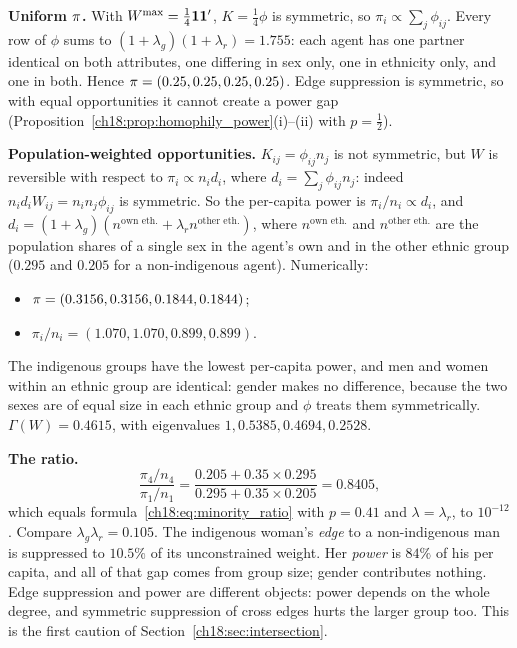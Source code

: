 \documentclass[../solutions_manual.tex]{subfiles}
\begin{document}
 \textbf{Uniform $\pi$.} With $W^{\max} = \frac14\mathbf{1}\mathbf{1}'$, $K = \frac14\phi$ is symmetric, so $\pi_i \propto \sum_j\phi_{ij}$. Every row of $\phi$ sums to $(1+\lambda_g)(1+\lambda_r) = 1.755$: each agent has one partner identical on both attributes, one differing in sex only, one in ethnicity only, and one in both. Hence $\pi = (0.25,\allowbreak 0.25,\allowbreak 0.25,\allowbreak 0.25)$. Edge suppression is symmetric, so with equal opportunities it cannot create a power gap (Proposition~\ref{ch18:prop:homophily_power}(i)--(ii) with $p = \frac12$).

 \textbf{Population-weighted opportunities.} $K_{ij} = \phi_{ij}n_j$ is not symmetric, but $W$ is reversible with respect to $\pi_i \propto n_i d_i$, where $d_i = \sum_j\phi_{ij}n_j$: indeed $n_id_iW_{ij} = n_in_j\phi_{ij}$ is symmetric. So the per-capita power is $\pi_i/n_i \propto d_i$, and $d_i = (1+\lambda_g)(n^{\text{own eth.}} + \lambda_r n^{\text{other eth.}})$, where $n^{\text{own eth.}}$ and $n^{\text{other eth.}}$ are the population shares of a single sex in the agent's own and in the other ethnic group ($0.295$ and $0.205$ for a non-indigenous agent). Numerically:
\begin{itemize}
\item $\pi = (0.3156,\allowbreak 0.3156,\allowbreak 0.1844,\allowbreak 0.1844)$;
\item $\pi_i/n_i = (1.070,\allowbreak 1.070,\allowbreak 0.899,\allowbreak 0.899)$.
\end{itemize}
The indigenous groups have the lowest per-capita power, and men and women within an ethnic group are identical: gender makes no difference, because the two sexes are of equal size in each ethnic group and $\phi$ treats them symmetrically. $\Gamma(W) = 0.4615$, with eigenvalues $1, 0.5385, 0.4694, 0.2528$.

 \textbf{The ratio.}
\[
\frac{\pi_4/n_4}{\pi_1/n_1} = \frac{0.205 + 0.35 \times 0.295}{0.295 + 0.35 \times 0.205} = 0.8405,
\]
which equals formula~\eqref{ch18:eq:minority_ratio} with $p = 0.41$ and $\lambda = \lambda_r$, to $10^{-12}$. Compare $\lambda_g\lambda_r = 0.105$. The indigenous woman's \emph{edge} to a non-indigenous man is suppressed to $10.5\%$ of its unconstrained weight. Her \emph{power} is $84\%$ of his per capita, and all of that gap comes from group size; gender contributes nothing. Edge suppression and power are different objects: power depends on the whole degree, and symmetric suppression of cross edges hurts the larger group too. This is the first caution of Section~\ref{ch18:sec:intersection}.
\end{document}
